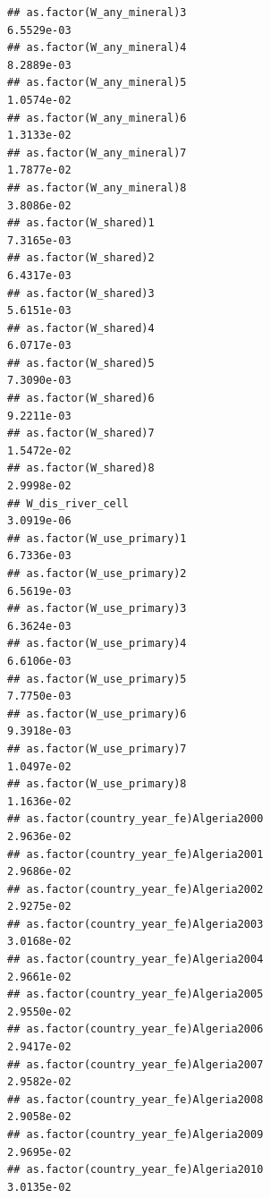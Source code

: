 \documentclass[
  a4paper,
]{article}
\begin{document}
\begin{verbatim}
## as.factor(W_any_mineral)3                                       6.5529e-03
## as.factor(W_any_mineral)4                                       8.2889e-03
## as.factor(W_any_mineral)5                                       1.0574e-02
## as.factor(W_any_mineral)6                                       1.3133e-02
## as.factor(W_any_mineral)7                                       1.7877e-02
## as.factor(W_any_mineral)8                                       3.8086e-02
## as.factor(W_shared)1                                            7.3165e-03
## as.factor(W_shared)2                                            6.4317e-03
## as.factor(W_shared)3                                            5.6151e-03
## as.factor(W_shared)4                                            6.0717e-03
## as.factor(W_shared)5                                            7.3090e-03
## as.factor(W_shared)6                                            9.2211e-03
## as.factor(W_shared)7                                            1.5472e-02
## as.factor(W_shared)8                                            2.9998e-02
## W_dis_river_cell                                                3.0919e-06
## as.factor(W_use_primary)1                                       6.7336e-03
## as.factor(W_use_primary)2                                       6.5619e-03
## as.factor(W_use_primary)3                                       6.3624e-03
## as.factor(W_use_primary)4                                       6.6106e-03
## as.factor(W_use_primary)5                                       7.7750e-03
## as.factor(W_use_primary)6                                       9.3918e-03
## as.factor(W_use_primary)7                                       1.0497e-02
## as.factor(W_use_primary)8                                       1.1636e-02
## as.factor(country_year_fe)Algeria2000                           2.9636e-02
## as.factor(country_year_fe)Algeria2001                           2.9686e-02
## as.factor(country_year_fe)Algeria2002                           2.9275e-02
## as.factor(country_year_fe)Algeria2003                           3.0168e-02
## as.factor(country_year_fe)Algeria2004                           2.9661e-02
## as.factor(country_year_fe)Algeria2005                           2.9550e-02
## as.factor(country_year_fe)Algeria2006                           2.9417e-02
## as.factor(country_year_fe)Algeria2007                           2.9582e-02
## as.factor(country_year_fe)Algeria2008                           2.9058e-02
## as.factor(country_year_fe)Algeria2009                           2.9695e-02
## as.factor(country_year_fe)Algeria2010                           3.0135e-02

\end{verbatim}
\end{document}
